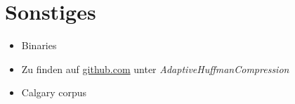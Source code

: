 \documentclass[utf8x]{beamer}
\begin{document}
    \section{Sonstiges}
    \frame{\tableofcontents[currentsection]}
    \begin{frame}[<+->]
    
        \begin{itemize}
            \item
                Binaries

            \item
                Zu finden auf \href{https://github.com/muesli4/AdaptiveHuffmanCompression/tree/ugly}{github.com} unter \emph{AdaptiveHuffmanCompression}
                
            \item
                Calgary corpus

        \end{itemize}

    \end{frame}
    
\end{document}
